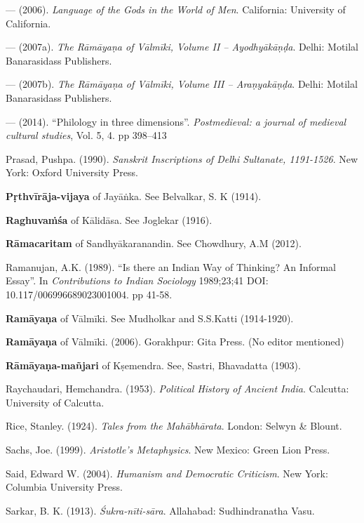 \begin{thebibliography}{99}
--- (2006). {\sl Language of the Gods in the World of Men}. California: University of California. 

--- (2007a). {\sl The Rāmāyaṇa of Vālmīki, Volume II – Ayodhyākāṇḍa}. Delhi: Motilal Banarasidass Publishers. 

--- (2007b). {\sl The Rāmāyaṇa of Vālmīki, Volume III – Araṇyakāṇḍa}. Delhi: Motilal Banarasidass Publishers. 

--- (2014). “Philology in three dimensions”. {\sl Postmedieval: a journal of medieval cultural studies}, Vol. 5, 4. pp 398–413

Prasad, Pushpa. (1990). {\sl Sanskrit Inscriptions of Delhi Sultanate, 1191-1526}. New York: Oxford University Press. 

{\bf Pṛthvīrāja-vijaya} of Jayāṅka. See Belvalkar, S. K (1914).

{\bf Raghuvaṁśa} of Kālidāsa. See Joglekar (1916).

{\bf Rāmacaritam} of Sandhyākaranandin. See Chowdhury, A.M (2012).

Ramanujan, A.K. (1989). “Is there an Indian Way of Thinking? An Informal Essay”. In {\sl Contributions to Indian Sociology} 1989;23;41 DOI: 10.117/006996689023001004. pp 41-58.

{\bf Ramāyaṇa} of Vālmīki. See Mudholkar and S.S.Katti (1914-1920).

{\bf Ramāyaṇa} of Vālmīki. (2006). Gorakhpur: Gita Press. (No editor mentioned)

{\bf Rāmāyaṇa-mañjari} of Kṣemendra. See, Sastri, Bhavadatta  (1903).

Raychaudari, Hemchandra. (1953). {\sl Political History of Ancient India}. Calcutta: University of Calcutta.

Rice, Stanley. (1924). {\sl Tales from the Mahābhārata}. London: Selwyn \& Blount. 

Sachs, Joe. (1999). {\sl Aristotle’s Metaphysics}. New Mexico: Green Lion Press. 

Said, Edward W. (2004).  {\sl Humanism and Democratic Criticism}. New York: Columbia University Press. 

Sarkar, B. K. (1913). {\sl Śukra-nīti-sāra}. Allahabad: Sudhindranatha Vasu. 


\end{thebibliography}
